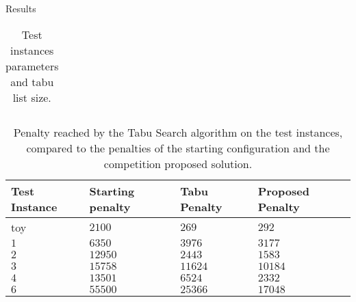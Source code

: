 \begin{section}{Results}
\begin{table}[h]
\begin{tabular}{lllllllll}
     \end{tabular}
     \caption{Test instances parameters and tabu list size.}
     \label{tab:parameters}
 \end{table}
 \begin{table}[h]
     \centering
     \begin{tabular}{llll}
         \hline
         \textbf{Test Instance} & \textbf{Starting penalty} & \textbf{Tabu Penalty} & \textbf{Proposed Penalty} \\ \hline
         toy                    & $2100$                       & $269$                 & $292$                     \\
         $1$                    & $6350$                       & $3976$                & $3177$                    \\
         $2$                    & $12950$                       & $2443$                & $1583$                    \\
         $3$                    & $15758$                       & $11624$               & $10184$                   \\
         $4$                    & $13501$                       & $6524$                & $2332$                    \\
         $6$                    & $55500$                       & $25366$               & $17048$                   \\
     \end{tabular}
     \caption{Penalty reached by the Tabu Search algorithm on the test instances, compared to the
         penalties of the starting configuration and the competition proposed solution.}
     \label{tab:penalties}
 \end{table}

\end{section}
